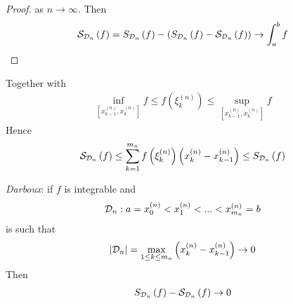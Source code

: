 \documentclass[a4paper]{article}
\begin{document}
\begin{coro}
\begin{proof}
as $n\to \infty$. Then
\begin{equation*}
\begin{aligned}
\mathcal{S}_{\mathcal{D}_n}\left(f\right) = S_{\mathcal{D}_n}\left(f\right) - \left(S_{\mathcal{D}_n}\left(f\right) - \mathcal{S}_{\mathcal{D}_n}\left(f\right)\right) \to \int_a^b f
\end{aligned}
\end{equation*}
\end{proof}
Together with
\begin{equation*}
\begin{aligned}
\inf_{\left[x_{k-1}^{\left(n\right)},x_k^{\left(n\right)}\right]} f \leq f\left(\xi_k^{\left(n\right)} \right) \leq \sup_{\left[x_{k-1}^{\left(n\right)},x_k^{\left(n\right)}\right]} f
\end{aligned}
\end{equation*}
Hence
\begin{equation*}
\begin{aligned}
\mathcal{S}_{\mathcal{D}_n}\left(f\right) \leq \sum_{k=1}^{m_n} f\left(\xi_k^{\left(n\right)}\right) \left(x_k^{\left(n\right)} - x_{k-1}^{\left(n\right)}\right) \leq S_{\mathcal{D}_n} \left(f\right)
\end{aligned}
\end{equation*}
\end{coro}

\begin{rem}
\emph{Darboux}: if $f$ is integrable and 
\begin{equation*}
\begin{aligned}
\mathcal{D}_n : a=x_0^{\left(n\right)}<x_1^{\left(n\right)}<...<x_{m_n}^{\left(n\right)} = b
\end{aligned}
\end{equation*}
is such that 
\begin{equation*}
\begin{aligned}
|\mathcal{D}_n| = \max_{1\leq k \leq m_n} \left(x_k^{\left(n\right)} - x_{k-1}^{\left(n\right)}\right) \to 0
\end{aligned}
\end{equation*}
Then
\begin{equation*}
\begin{aligned}
S_{\mathcal{D}_n} \left(f\right) - \mathcal{S}_{\mathcal{D}_n} \left(f\right) \to 0
\end{aligned}
\end{equation*}
\end{rem}
\end{document}
